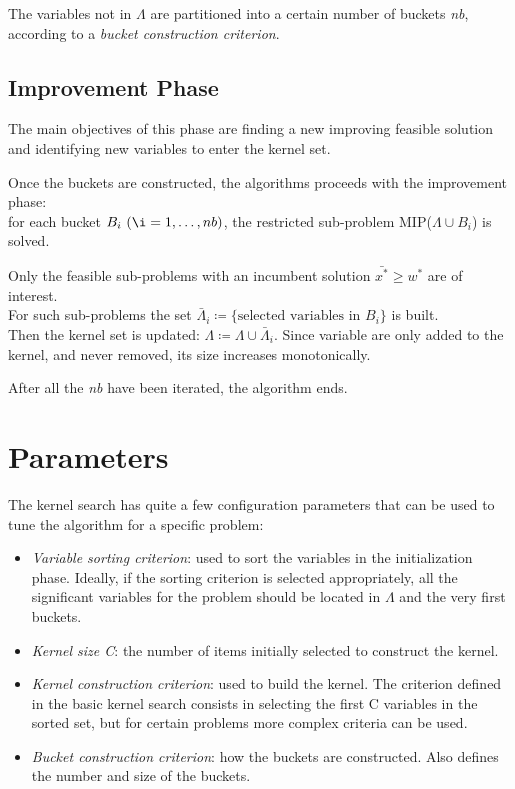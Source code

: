 The variables not in \(\Lambda\) are partitioned into a certain number of buckets \textit{nb}, according
to a \textit{bucket construction criterion}.

\subsection{Improvement Phase}
The main objectives of this phase are finding a new improving feasible solution and identifying new variables
to enter the kernel set.

Once the buckets are constructed, the algorithms proceeds with the improvement phase:\\
for each bucket \(B_{i} \ (\i=1,\dots,nb)\),
the restricted sub-problem MIP(\(\Lambda \cup B_{i}\)) is solved.

Only the feasible sub-problems with an incumbent solution \(\bar{x^{*}} \geq w^{*}\) are of interest.\\
For such sub-problems the set \(\bar{\Lambda}_{i} \coloneqq \{\text{selected variables in } B_{i}\}\) is built.\\
Then the kernel set is updated: \(\Lambda \coloneqq \Lambda \cup \bar{\Lambda}_{i}\).
Since variable are only added to the kernel, and never removed, its size increases monotonically.

After all the \textit{nb} have been iterated, the algorithm ends.


\section{Parameters}
The kernel search has quite a few configuration parameters that can be used to tune the algorithm for a specific
problem:
\begin{itemize}
    \item \textit{Variable sorting criterion}: used to sort the variables in the initialization phase.
    Ideally, if the sorting criterion is selected appropriately,
    all the significant variables for the problem should be located in \(\Lambda\) and the very first buckets.
    \item \textit{Kernel size C}: the number of items initially selected to construct the kernel.
    \item \textit{Kernel construction criterion}: used to build the kernel.
    The criterion defined in the basic kernel search consists in selecting
    the first C variables in the sorted set, but for certain problems more complex criteria can be used.
    \item \textit{Bucket construction criterion}: how the buckets are constructed.
    Also defines the number and size of the buckets.
\end{itemize}


